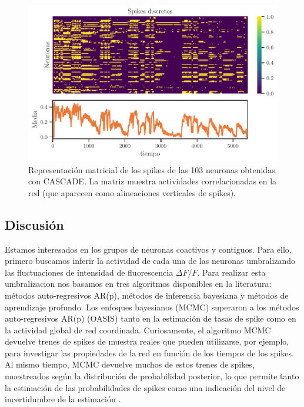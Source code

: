 \begin{figure}[h!]
	\centering{}\includegraphics[width=\imsize]{cascade_3.pdf}
	\caption[Representación  matricial de los spikes de las 103 neuronas obtenidas con CASCADE. ]{Representación  matricial de los spikes de las 103 neuronas obtenidas con CASCADE. La matriz muestra  actividades correlacionadas en la red (que aparecen como alineaciones verticales de spikes).}\label{f:cascade}  
\end{figure}



\subsection{Discusión}

Estamos interesados en los grupos de neuronas coactivos y contiguos. Para ello, primero buscamos inferir  la actividad de cada una de las neuronas umbralizando las fluctuaciones de intensidad de fluorescencia $\Delta F/F$.  Para realizar esta umbralizacion  nos basamos  en tres algoritmos disponibles en la literatura: métodos auto-regresivos AR(p), métodos de inferencia bayesiana y métodos de aprendizaje profundo.  Los enfoques bayesianos  (MCMC)   superaron a los métodos auto-regresivos AR(p)  (OASIS) tanto en la estimación de tasas de spike como en la actividad global de red coordinada. Curiosamente, el algoritmo MCMC  devuelve trenes de spikes de muestra reales que pueden utilizarse, por ejemplo, para investigar las propiedades de la red en función de los tiempos de los spikes. Al mismo tiempo, MCMC devuelve muchos de estos trenes de spikes, muestreados según la distribución de probabilidad posterior, lo que permite tanto la estimación de las probabilidades de spikes como una indicación del nivel de incertidumbre de la estimación \cite{deneux_accurate_2016}. 

